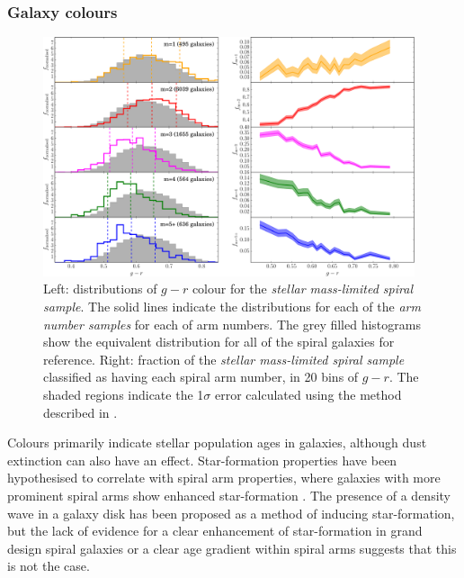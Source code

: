 \documentclass[useAMS,usenatbib]{mn2e}
\begin{document}
\subsubsection{Galaxy colours}
\label{sec:colours}

\begin{figure}
		\centering

        \includegraphics[width=0.975\textwidth]{Images/Results/colour_plots.pdf}

        \caption{Left: distributions of $g-r$ colour for the \textit{stellar mass-limited spiral sample}. The solid lines indicate the distributions for each of the \textit{arm number samples} for each of arm numbers. The grey filled histograms show the equivalent distribution for all of the spiral galaxies for reference. Right: fraction of the \textit{stellar mass-limited spiral sample} classified as having each spiral arm number, in 20 bins of $g-r$. The shaded regions indicate the 1$\sigma$ error calculated using the method described in \citet{Cameron_11}.}

        \label{fig:colour_plots}

\end{figure}

Colours primarily indicate stellar population ages in galaxies, although dust extinction can also have an effect. Star-formation properties have been hypothesised to correlate with spiral arm properties, where galaxies with more prominent spiral arms show enhanced star-formation \citep{Seigar_98,Kendall_15}. The presence of a density wave in a galaxy disk has been proposed as a method of inducing star-formation, but the lack of evidence for a clear enhancement of star-formation in grand design spiral galaxies \citep{EE_86,Foyle_10,Willett_15} or a clear age gradient within spiral arms \citep{Foyle_11,Dobbs_14,Choi_15} suggests that this is not the case. 
\end{document}
